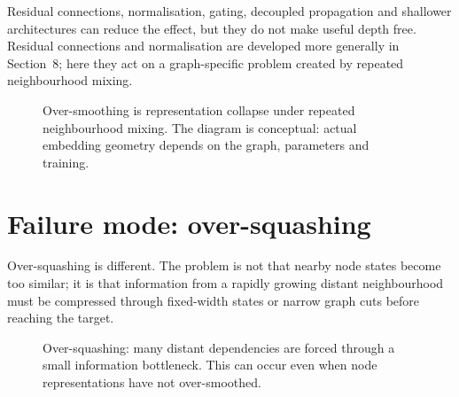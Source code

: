 Residual connections, normalisation, gating, decoupled propagation and shallower architectures can reduce the effect, but they do not make useful depth free.
Residual connections and normalisation are developed more generally in Section~8; here they act on a graph-specific problem created by repeated neighbourhood mixing.

\begin{figure}[htbp]
\centering
{}
\caption{Over-smoothing is representation collapse under repeated neighbourhood mixing. The diagram is conceptual: actual embedding geometry depends on the graph, parameters and training.}
\label{fig:gnn-oversmoothing}
\end{figure}

\section{Failure mode: over-squashing}
Over-squashing is different.
The problem is not that nearby node states become too similar; it is that information from a rapidly growing distant neighbourhood must be compressed through fixed-width states or narrow graph cuts before reaching the target.

\begin{figure}[htbp]
\centering
{}
\caption{Over-squashing: many distant dependencies are forced through a small information bottleneck. This can occur even when node representations have not over-smoothed.}
\label{fig:gnn-oversquashing}
\end{figure}


